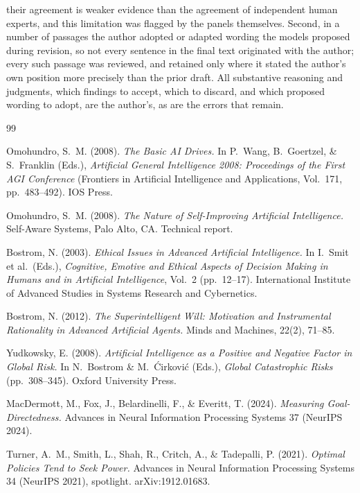 \documentclass[11pt]{article}
\theoremstyle{definition}
\begin{document}
their agreement is weaker evidence than the agreement of independent human experts, and this limitation was flagged by the panels themselves. Second, in a number of passages the author adopted or adapted wording the models proposed during revision, so not every sentence in the final text originated with the author; every such passage was reviewed, and retained only where it stated the author's own position more precisely than the prior draft. All substantive reasoning and judgments, which findings to accept, which to discard, and which proposed wording to adopt, are the author's, as are the errors that remain.

\begin{thebibliography}{99}

Omohundro, S.~M. (2008). \emph{The Basic AI Drives.} In P.~Wang, B.~Goertzel, \& S.~Franklin (Eds.), \emph{Artificial General Intelligence 2008: Proceedings of the First AGI Conference} (Frontiers in Artificial Intelligence and Applications, Vol.~171, pp.~483--492). IOS Press.

Omohundro, S.~M. (2008). \emph{The Nature of Self-Improving Artificial Intelligence.} Self-Aware Systems, Palo Alto, CA. Technical report.

Bostrom, N. (2003). \emph{Ethical Issues in Advanced Artificial Intelligence.} In I.~Smit et al.\ (Eds.), \emph{Cognitive, Emotive and Ethical Aspects of Decision Making in Humans and in Artificial Intelligence}, Vol.~2 (pp.~12--17). International Institute of Advanced Studies in Systems Research and Cybernetics.

Bostrom, N. (2012). \emph{The Superintelligent Will: Motivation and Instrumental Rationality in Advanced Artificial Agents.} Minds and Machines, 22(2), 71--85.

Yudkowsky, E. (2008). \emph{Artificial Intelligence as a Positive and Negative Factor in Global Risk.} In N.~Bostrom \& M.~\'{C}irkovi\'{c} (Eds.), \emph{Global Catastrophic Risks} (pp.~308--345). Oxford University Press.

MacDermott, M., Fox, J., Belardinelli, F., \& Everitt, T. (2024). \emph{Measuring Goal-Directedness.} Advances in Neural Information Processing Systems 37 (NeurIPS 2024).

Turner, A.~M., Smith, L., Shah, R., Critch, A., \& Tadepalli, P. (2021). \emph{Optimal Policies Tend to Seek Power.} Advances in Neural Information Processing Systems 34 (NeurIPS 2021), spotlight. arXiv:1912.01683.


\end{thebibliography}
\end{document}
